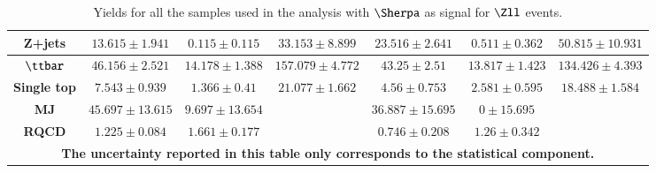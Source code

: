 \begin{table}[]
{\begin{tabular}{|ccccccc|}
			\multicolumn{1}{|c|}{\textbf{Z+jets}}       & \multicolumn{1}{c|}{$13.615\pm1.941$}    & \multicolumn{1}{c|}{$0.115\pm0.115$}     & \multicolumn{1}{c|}{$33.153\pm8.899$}                       & \multicolumn{1}{c|}{$23.516\pm2.641$}    & \multicolumn{1}{c|}{$0.511\pm0.362$}     & $50.815\pm10.931$                   \\ \hline
			\multicolumn{1}{|c|}{\textbf{$\ttbar$}}     & \multicolumn{1}{c|}{$46.156\pm2.521$}    & \multicolumn{1}{c|}{$14.178\pm1.388$}    & \multicolumn{1}{c|}{$157.079\pm4.772$}                      & \multicolumn{1}{c|}{$43.25\pm2.51$}      & \multicolumn{1}{c|}{$13.817\pm1.423$}    & $134.426\pm4.393$                   \\ \hline
			\multicolumn{1}{|c|}{\textbf{Single top}}   & \multicolumn{1}{c|}{$7.543\pm0.939$}     & \multicolumn{1}{c|}{$1.366\pm0.41$}      & \multicolumn{1}{c|}{$21.077\pm1.662$}                       & \multicolumn{1}{c|}{$4.56\pm0.753$}      & \multicolumn{1}{c|}{$2.581\pm0.595$}     & $18.488\pm1.584$                    \\ \hline
			\multicolumn{1}{|c|}{\textbf{MJ}}           & \multicolumn{1}{c|}{$45.697\pm13.615$}   & \multicolumn{1}{c|}{$9.697\pm13.654$}    & \multicolumn{1}{c|}{}                                       & \multicolumn{1}{c|}{$36.887\pm15.695$}   & \multicolumn{1}{c|}{$0\pm15.695$}        &                                     \\ \hline
			\multicolumn{1}{|c|}{\textbf{RQCD}}         & \multicolumn{1}{c|}{$1.225\pm0.084$}     & \multicolumn{1}{c|}{$1.661\pm0.177$}     & \multicolumn{1}{c|}{}                                       & \multicolumn{1}{c|}{$0.746\pm0.208$}     & \multicolumn{1}{c|}{$1.26\pm0.342$}      &                                     \\ \hline
			\multicolumn{7}{|c|}{\textbf{The uncertainty reported in this table only corresponds to the statistical component.}}                                                                                                                                                                                                        \\ \hline
		\end{tabular}
		\caption{Yields for all the samples used in the analysis with $\Sherpa$ as signal for $\Zll$ events. }
	\label{Tab6}
}
\end{table}

